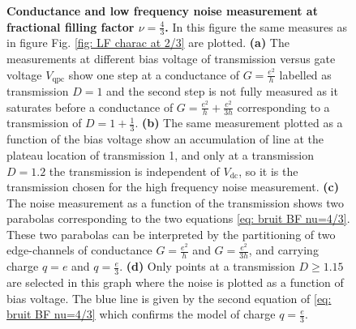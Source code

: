 \begin{figure}[hptb]
	\caption{\textbf{Conductance and low frequency noise measurement at fractional filling factor $\nu = \frac{4}{3}$.} In this figure the same measures as in figure Fig. \ref{fig: LF charac at 2/3} are plotted. \textbf{(a)} The measurements at different bias voltage of transmission versus gate voltage $V_{\mathrm{qpc}}$ show one step at a conductance of $G = \frac{e^{2}}{h}$ labelled as transmission $D = 1$ and the second step is not fully measured as it saturates before a conductance of $G = \frac{e^{2}}{h}+\frac{e^{2}}{3h}$ corresponding to a transmission of $D = 1+\frac{1}{3}$. \textbf{(b)} The same measurement plotted as a function of the bias voltage show an accumulation of line at the plateau location of transmission 1, and only at a transmission $D = 1.2$ the transmission is independent of $V_{\mathrm{dc}}$, so it is the transmission chosen for the high frequency noise measurement. \textbf{(c)} The noise measurement as a function of the transmission shows two parabolas corresponding to the two equations \eqref{eq: bruit BF nu=4/3}. These two parabolas can be interpreted by the partitioning of two edge-channels of conductance $G = \frac{e^{2}}{h}$ and $G = \frac{e^{2}}{3h}$, and carrying charge $q = e$ and $q = \frac{e}{3}$. \textbf{(d)} Only points at a transmission $D \geq 1.15$ are selected in this graph where the noise is plotted as a function of bias voltage. The blue line is given by the second equation of \eqref{eq: bruit BF nu=4/3} which confirms the model of charge $q = \frac{e}{3}$.
	}
	\label{fig: LF charac at 4/3}
\end{figure}

